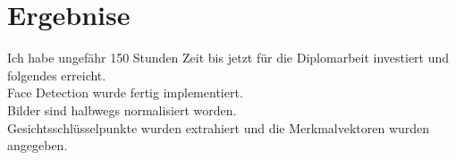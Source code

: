\section{Ergebnise}


Ich habe ungefähr 150 Stunden Zeit bis jetzt für die Diplomarbeit investiert und folgendes erreicht.\\ 
Face Detection wurde fertig implementiert.\\
Bilder sind halbwegs normalisiert worden. \\
Gesichtsschlüsselpunkte wurden extrahiert und die Merkmalvektoren wurden angegeben.  

